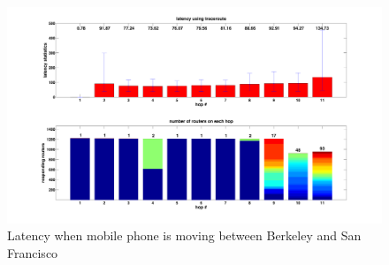 \begin{figure}
  \centering
  \includegraphics[width=\linewidth]{../figs/mobile_sfo.pdf}
  \caption{Latency when mobile phone is moving between Berkeley and San Francisco}
  \label{fig:mobile_mobile}
\end{figure}

